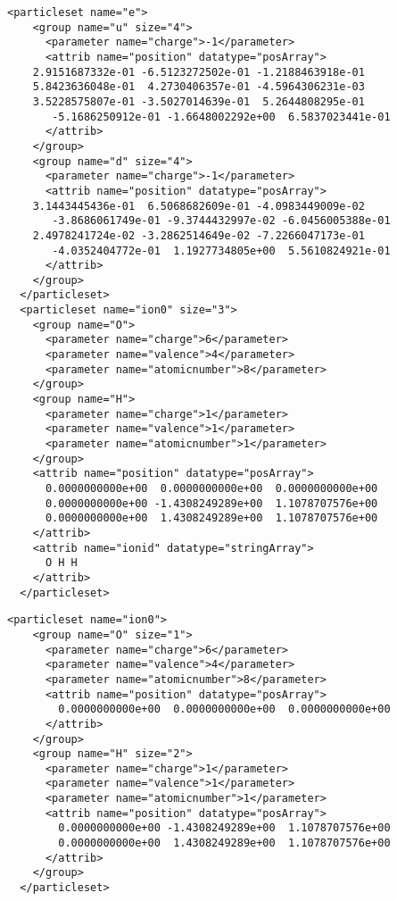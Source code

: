 \begin{minipage}{\linewidth}
\begin{lstlisting}[style=QMCPXML,caption=particleset elements for ions and electrons specifying electron start positions]
  <particleset name="e">
    <group name="u" size="4">
      <parameter name="charge">-1</parameter>
      <attrib name="position" datatype="posArray">
	2.9151687332e-01 -6.5123272502e-01 -1.2188463918e-01
	5.8423636048e-01  4.2730406357e-01 -4.5964306231e-03
	3.5228575807e-01 -3.5027014639e-01  5.2644808295e-01
       -5.1686250912e-01 -1.6648002292e+00  6.5837023441e-01
      </attrib>
    </group>
    <group name="d" size="4">
      <parameter name="charge">-1</parameter>
      <attrib name="position" datatype="posArray">
	3.1443445436e-01  6.5068682609e-01 -4.0983449009e-02
       -3.8686061749e-01 -9.3744432997e-02 -6.0456005388e-01
	2.4978241724e-02 -3.2862514649e-02 -7.2266047173e-01
       -4.0352404772e-01  1.1927734805e+00  5.5610824921e-01
      </attrib>
    </group>
  </particleset>
  <particleset name="ion0" size="3">
    <group name="O">
      <parameter name="charge">6</parameter>
      <parameter name="valence">4</parameter>
      <parameter name="atomicnumber">8</parameter>
    </group>
    <group name="H">
      <parameter name="charge">1</parameter>
      <parameter name="valence">1</parameter>
      <parameter name="atomicnumber">1</parameter>
    </group>
    <attrib name="position" datatype="posArray">
      0.0000000000e+00  0.0000000000e+00  0.0000000000e+00
      0.0000000000e+00 -1.4308249289e+00  1.1078707576e+00
      0.0000000000e+00  1.4308249289e+00  1.1078707576e+00
    </attrib>
    <attrib name="ionid" datatype="stringArray">
      O H H 
    </attrib>
  </particleset>
\end{lstlisting}
\end{minipage}

\begin{minipage}{\linewidth}
\begin{lstlisting}[style=QMCPXML,caption=particleset elements for ions specifying positions by ion type]
  <particleset name="ion0">
    <group name="O" size="1">
      <parameter name="charge">6</parameter>
      <parameter name="valence">4</parameter>
      <parameter name="atomicnumber">8</parameter>
      <attrib name="position" datatype="posArray">
        0.0000000000e+00  0.0000000000e+00  0.0000000000e+00
      </attrib>
    </group>
    <group name="H" size="2">
      <parameter name="charge">1</parameter>
      <parameter name="valence">1</parameter>
      <parameter name="atomicnumber">1</parameter>
      <attrib name="position" datatype="posArray">
        0.0000000000e+00 -1.4308249289e+00  1.1078707576e+00
        0.0000000000e+00  1.4308249289e+00  1.1078707576e+00
      </attrib>
    </group>
  </particleset>
\end{lstlisting}
\end{minipage}
